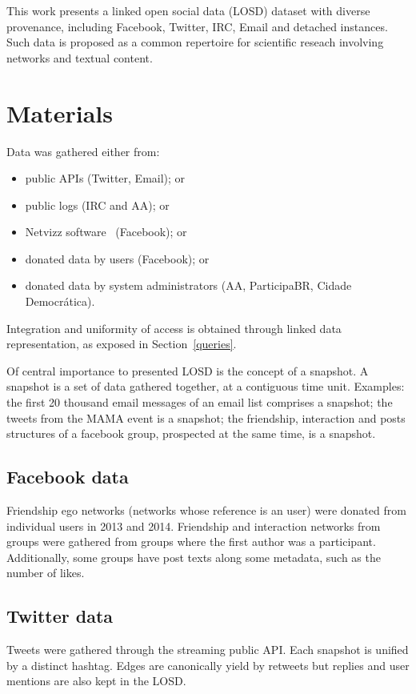 \documentclass[review]{elsarticle}
\begin{document}
This work presents a linked open social data (LOSD) dataset with diverse
provenance, including Facebook, Twitter, IRC, Email and detached
instances.
Such data is proposed as a common repertoire for scientific
reseach involving networks and textual content.


\section{Materials}\label{materials}
Data was gathered either from:
\begin{itemize}
    \item public APIs (Twitter, Email); or
    \item public logs (IRC and AA); or
    \item Netvizz software~\cite{netvizz} (Facebook); or
    \item donated data by users (Facebook); or
    \item donated data by system administrators (AA, ParticipaBR,
        Cidade Democr\'atica).
\end{itemize}

Integration and uniformity of access is obtained through linked data
representation, as exposed in Section~\ref{queries}.

Of central importance to presented LOSD is the concept of a snapshot.
A snapshot is a set of data gathered together, at a contiguous time
unit.
Examples: the first 20 thousand email messages of an email list
comprises a snapshot; the tweets from the MAMA event is a
snapshot; the friendship, interaction and posts structures of a facebook
group, prospected at the same time, is a snapshot.

\subsection{Facebook data}
Friendship ego networks (networks whose reference is an user)
were donated from individual users in 2013 and 2014.
Friendship and interaction networks from groups were gathered from
groups where the first author was a participant.
Additionally, some groups have post texts along some metadata, such as
the number of likes.

\subsection{Twitter data}
Tweets were gathered through the streaming public API.
Each snapshot is unified by a distinct hashtag.
Edges are canonically yield by retweets but replies and user mentions
are also kept in the LOSD.
\end{document}
